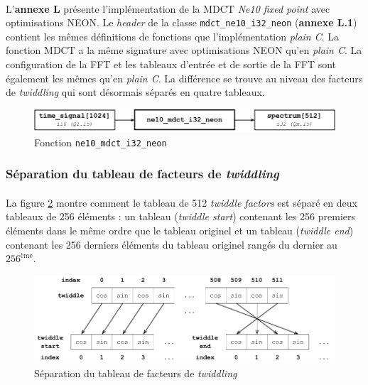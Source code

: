 \documentclass{article}
\begin{document}
    \paragraph{}
    L'\textbf{annexe L} présente l'implémentation de la MDCT \emph{Ne10 fixed point} avec optimisations NEON. Le \emph{header} de la classe \texttt{mdct\_ne10\_i32\_neon} (\textbf{annexe L.1}) contient les mêmes définitions de fonctions que l'implémentation \emph{plain C}. La fonction MDCT a la même signature avec optimisations NEON qu'en \emph{plain C}. La configuration de la FFT et les tableaux d'entrée et de sortie de la FFT sont également les mêmes qu'en \emph{plain C}. La différence se trouve au niveau des facteurs de \emph{twiddling} qui sont désormais séparés en quatre tableaux.
    \begin{figure}[H]
        \centering
        \includegraphics[width=.8\linewidth]{./images/func_ne10_mdct_i32_neon.pdf}
        \caption{Fonction \texttt{ne10\_mdct\_i32\_neon}}
        \label{fig:func_ne10_mdct_i32_neon}
    \end{figure}


    \subsubsection{Séparation du tableau de facteurs de \emph{twiddling}}
    \paragraph{}
    La figure \ref{fig:split_twiddles} montre comment le tableau de 512 \emph{twiddle factors} est séparé en deux tableaux de 256 éléments : un tableau (\emph{twiddle start}) contenant les 256 premiers éléments dans le même ordre que le tableau originel et un tableau (\emph{twiddle end}) contenant les 256 derniers éléments du tableau originel rangés du dernier au $256^{\text{ème}}$.

    \begin{figure}[H]
        \centering
        \includegraphics[width=.8\linewidth]{./images/split_twiddles.pdf}
        \caption{Séparation du tableau de facteurs de \emph{twiddling}}
        \label{fig:split_twiddles}
    \end{figure}
\end{document}

